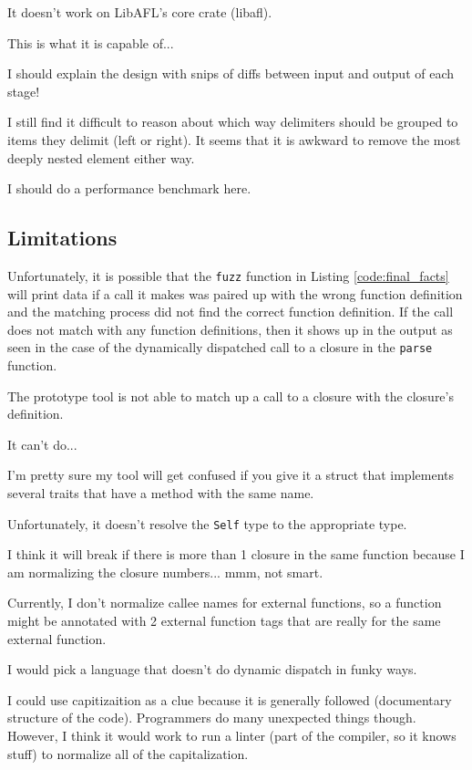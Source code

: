 \documentclass[11pt]{article}
\begin{document}
It doesn't work on LibAFL's core crate (libafl).

This is what it is capable of...

I should explain the design with snips of diffs between input and output of each stage!

I still find it difficult to reason about which way delimiters should be grouped to items they delimit (left or right).
It seems that it is awkward to remove the most deeply nested element either way.

I should do a performance benchmark here.

\subsection{Limitations}

Unfortunately, it is possible that the \lstinline{fuzz} function in Listing \ref{code:final_facts} will print data if a call it makes was paired up with the wrong function definition and the matching process did not find the correct function definition.
If the call does not match with any function definitions, then it shows up in the output as seen in the case of the dynamically dispatched call to a closure in the \lstinline{parse} function.

The prototype tool is not able to match up a call to a closure with the closure's definition.

It can't do...

I'm pretty sure my tool will get confused if you give it a struct that implements several traits that have a method with the same name.

Unfortunately, it doesn't resolve the \lstinline{Self} type to the appropriate type.

I think it will break if there is more than 1 closure in the same function because I am normalizing the closure numbers... mmm, not smart.

Currently, I don't normalize callee names for external functions, so a function might be annotated with 2 external function tags that are really for the same external function.

I would pick a language that doesn't do dynamic dispatch in funky ways.

I could use capitizaition as a clue because it is generally followed (documentary structure of the code).
Programmers do many unexpected things though.
However, I think it would work to run a linter (part of the compiler, so it knows stuff) to normalize all of the capitalization.
\end{document}
